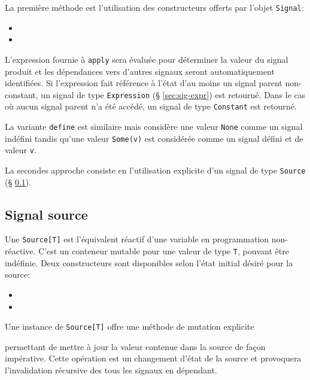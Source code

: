La première méthode est l'utilisation des constructeurs offerts par l'objet \texttt{Signal}:

\begin{itemize}
	\item {}
	\item {}
\end{itemize}

L'expression fournie à \texttt{apply} sera évaluée pour déterminer la valeur du signal produit et les dépendances vers d'autres signaux seront automatiquement identifiées. Si l'expression fait référence à l'état d'au moins un signal parent non-constant, un signal de type \texttt{Expression} (§ \ref{sec:sig-expr}) est retourné. Dans le cas où aucun signal parent n'a été accédé, un signal de type \texttt{Constant} est retourné.

La variante \texttt{define} est similaire mais considère une valeur \texttt{None} comme un signal indéfini tandis qu'une valeur \texttt{Some(v)} est considérée comme un signal défini et de valeur \texttt{v}. 

La secondes approche consiste en l'utilisation explicite d'un signal de type \texttt{Source} (§ \ref{sec:sig-source}). 

\subsection{Signal source} \label{sec:sig-source}

Une \texttt{Source[T]} est l'équivalent réactif d'une variable en programmation non-réactive. C'est un conteneur mutable pour une valeur de type \texttt{T}, pouvant être indéfinie. Deux constructeurs sont disponibles selon l'état initial désiré pour la source:

\begin{itemize}
	\item {}
	\item {}
\end{itemize}

Une instance de \texttt{Source[T]} offre une méthode de mutation explicite
\begin{center}
\end{center}
permettant de mettre à jour la valeur contenue dans la source de façon impérative. Cette opération est un changement d'état de la source et provoquera l'invalidation récursive des tous les signaux en dépendant.

